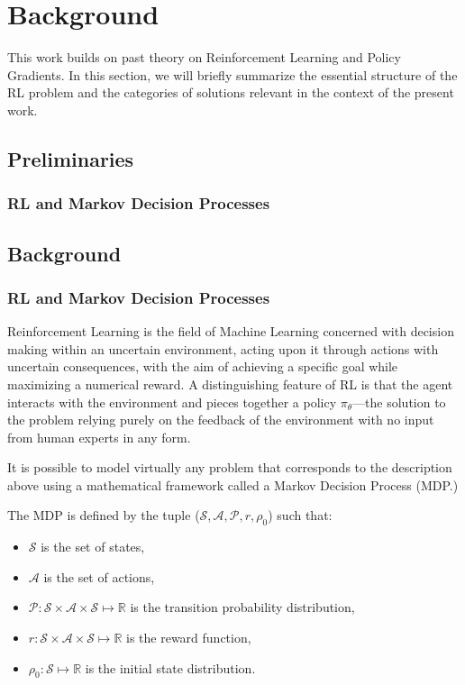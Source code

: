 \section{Background}
\label{sec:prelim}
This work builds on past theory on Reinforcement Learning and Policy Gradients. In this section, we will briefly summarize the essential structure of the RL problem and the categories of solutions relevant in the context of the present work.


\subsection{Preliminaries}

\subsubsection{RL and Markov Decision Processes}

\subsection{Background}

\subsubsection*{RL and Markov Decision Processes}

Reinforcement Learning is the field of Machine Learning concerned with decision making within an uncertain environment, acting upon it through actions with uncertain consequences, with the aim of achieving a specific goal while maximizing a numerical reward. A distinguishing feature of RL is that the agent interacts with the environment and pieces together a policy $\pi_{\theta}$––the solution to the problem relying purely on the feedback of the environment with no input from human experts in any form. 

It is possible to model virtually any problem that corresponds to the description above using a mathematical framework called a Markov Decision Process (MDP.) 

The MDP is defined by the tuple ($\mathcal{S}, \mathcal{A}, \mathcal{P}, r, \rho_0$) such that:
\begin{itemize}
\item $\mathcal{S}$ is the set of states, 
\item $\mathcal{A}$ is the set of actions, 
\item $\mathcal{P}: \mathcal{S}\times\mathcal{A}\times\mathcal{S}\mapsto \mathbb{R}$ is the transition probability distribution,
\item $r: \mathcal{S}\times\mathcal{A}\times\mathcal{S} \mapsto \mathbb{R}$ is the reward function,
\item $\rho_0:\mathcal{S}\mapsto\mathbb{R}$ is the initial state distribution.
\end{itemize}


